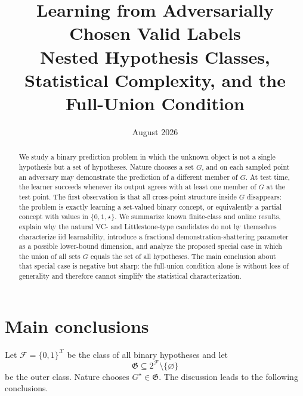 \documentclass[11pt]{article}
\title{\textbf{Learning from Adversarially Chosen Valid Labels}\\[0.35em]
\large Nested Hypothesis Classes, Statistical Complexity, and the Full-Union Condition}
\author{}
\date{August 2026}
\theoremstyle{definition}
\theoremstyle{remark}
\newcommand{\X}{\mathcal X}
\newcommand{\Y}{\{0,1\}}
\newcommand{\F}{\mathcal F}
\newcommand{\Outer}{\mathfrak G}
\newcommand{\1}{\mathbf 1}
\begin{document}
\maketitle

\begin{abstract}
We study a binary prediction problem in which the unknown object is not a single hypothesis but a set of hypotheses. Nature chooses a set $G$, and on each sampled point an adversary may demonstrate the prediction of a different member of $G$. At test time, the learner succeeds whenever its output agrees with at least one member of $G$ at the test point. The first observation is that all cross-point structure inside $G$ disappears: the problem is exactly learning a set-valued binary concept, or equivalently a partial concept with values in $\{0,1,\star\}$. We summarize known finite-class and online results, explain why the natural VC- and Littlestone-type candidates do not by themselves characterize iid learnability, introduce a fractional demonstration-shattering parameter as a possible lower-bound dimension, and analyze the proposed special case in which the union of all sets $G$ equals the set of all hypotheses. The main conclusion about that special case is negative but sharp: the full-union condition alone is without loss of generality and therefore cannot simplify the statistical characterization.
\end{abstract}

\tableofcontents

\section{Main conclusions}

Let $\F=\Y^{\X}$ be the class of all binary hypotheses and let
\[
    \Outer\subseteq 2^{\F}\setminus\{\varnothing\}
\]
be the outer class. Nature chooses $G^\star\in\Outer$. The discussion leads to the following conclusions.
\end{document}
